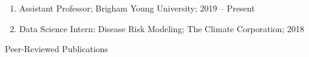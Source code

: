 \documentclass[11pt]{article}
\newcommand{\head}[1]{ %
    \bigskip %
    \begin{large}\begin{bf}{#1}\end{bf}\end{large} %

    \ \\ [-1.3cm] %

    \hrulefill}
\begin{document}
\begin{enumerate}[label=$\bullet$]

\item Assistant Professor; Brigham Young University; 2019 -- Present


\item Data Science Intern: Disease Risk Modeling; The Climate Corporation; 2018




\end{enumerate}



%


\vspace{2mm}
\head{Peer-Reviewed Publications}
\end{document}
